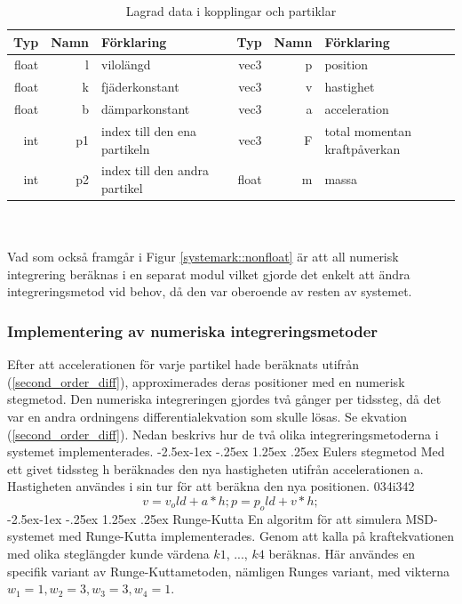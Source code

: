 \documentclass[a4paper,12pt,oneside,final,swedish]{extarticle}
\makeatletter
\renewcommand\paragraph{\@startsection{paragraph}{4}{\z@}%
            {-2.5ex\@plus -1ex \@minus -.25ex}%
            {1.25ex \@plus .25ex}%
            {\normalfont\normalsize\bfseries}}
\makeatother
\begin{document}
\begin{table}[h!]
  \centering
  \caption{Lagrad data i kopplingar och partiklar}
  \begin{tabular}{| r r l | r r l |}
    \hline
     Typ & Namn & Förklaring & Typ & Namn & Förklaring\\
    \hline
    float & l & vilolängd & vec3 & p & position\\ 
    float & k & fjäderkonstant & vec3 & v & hastighet\\ 
    float & b & dämparkonstant & vec3 & a & acceleration\\ 
    int & p1 & index till den ena partikeln & vec3 & F & total momentan kraftpåverkan\\ 
    int & p2 & index till den andra partikel & float & m & massa \\
    \hline
    \end{tabular}
  \label{table_ark} %
\end{table}
\\\\
Vad som också framgår i Figur \ref{systemark::nonfloat} är att all numerisk integrering beräknas i en separat modul vilket gjorde det enkelt att ändra integreringsmetod vid behov, då den var oberoende av resten av systemet.

\subsubsection{Implementering av numeriska integreringsmetoder}
Efter att accelerationen för varje partikel hade beräknats utifrån (\ref{second_order_diff}), approximerades deras positioner med en numerisk stegmetod. Den numeriska integreringen gjordes två gånger per tidssteg, då det var en andra ordningens differentialekvation som skulle lösas. Se ekvation (\ref{second_order_diff}). Nedan beskrivs hur de två olika integreringsmetoderna i systemet implementerades.
\paragraph{Eulers stegmetod} 
Med ett givet tidssteg h beräknades den nya hastigheten utifrån accelerationen a. Hastigheten användes i sin tur för att beräkna den nya positionen. 034i342
	\begin{equation} 
	v = v_old + a*h;		%
	p = p_old + v*h; 
	\end{equation}
\paragraph{Runge-Kutta}
En algoritm för att simulera MSD-systemet med Runge-Kutta implementerades. Genom att kalla på kraftekvationen med olika steglängder kunde värdena $k1$, ..., $k4$ beräknas. Här användes en specifik variant av Runge-Kuttametoden, nämligen Runges variant, med vikterna \begin{math} w_1 = 1, w_2 = 3, w_3 = 3, w_4 = 1 \end{math}.
\end{document}
